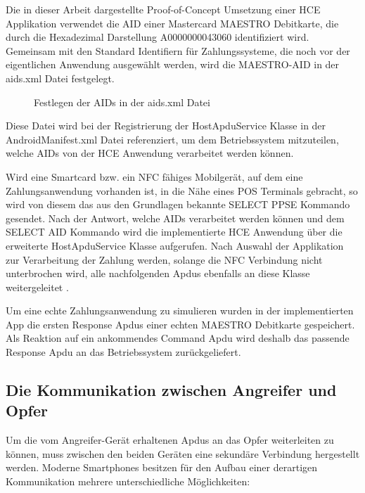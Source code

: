Die in dieser Arbeit dargestellte Proof-of-Concept Umsetzung einer HCE Applikation verwendet die AID einer Mastercard MAESTRO Debitkarte, die durch die Hexadezimal Darstellung A0000000043060 identifiziert wird. Gemeinsam mit den Standard Identifiern für Zahlungssysteme, die noch vor der eigentlichen Anwendung ausgewählt werden, wird die MAESTRO-AID in der aids.xml Datei festgelegt. 

\begin{figure}
	\caption{Festlegen der AIDs in der aids.xml Datei}
\end{figure}

Diese Datei wird bei der Registrierung der HostApduService Klasse in der AndroidManifest.xml Datei referenziert, um dem Betriebssystem mitzuteilen, welche AIDs von der HCE Anwendung verarbeitet werden können. 

Wird eine Smartcard bzw. ein NFC fähiges Mobilgerät, auf dem eine Zahlungsanwendung vorhanden ist, in die Nähe eines POS Terminals gebracht, so wird von diesem das aus den Grundlagen bekannte SELECT PPSE Kommando gesendet. Nach der Antwort, welche AIDs verarbeitet werden können und dem SELECT AID Kommando wird die implementierte HCE Anwendung über die erweiterte HostApduService Klasse aufgerufen. 
Nach Auswahl der Applikation zur Verarbeitung der Zahlung werden, solange die NFC Verbindung nicht unterbrochen wird, alle nachfolgenden Apdus ebenfalls an diese Klasse weitergeleitet \cite{androidHce}. 

Um eine echte Zahlungsanwendung zu simulieren wurden in der implementierten App die ersten Response Apdus einer echten MAESTRO Debitkarte gespeichert. Als Reaktion auf ein ankommendes Command Apdu wird deshalb das passende Response Apdu an das Betriebssystem zurückgeliefert. 

\subsection{Die Kommunikation zwischen Angreifer und Opfer}

Um die vom Angreifer-Gerät erhaltenen Apdus an das Opfer weiterleiten zu können, muss zwischen den beiden Geräten eine sekundäre Verbindung hergestellt werden. Moderne Smartphones besitzen für den Aufbau einer derartigen Kommunikation mehrere unterschiedliche Möglichkeiten:

